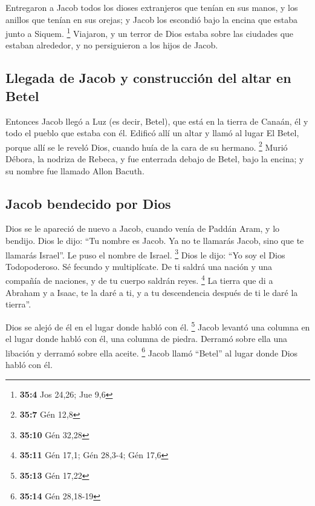  Entregaron a Jacob todos los dioses extranjeros que
tenían en sus manos, y los anillos que tenían en sus orejas; y Jacob los
escondió bajo la encina que estaba junto a Siquem. \footnote{\textbf{35:4}
  Jos 24,26; Jue 9,6}  Viajaron, y un terror de Dios
estaba sobre las ciudades que estaban alrededor, y no persiguieron a los
hijos de Jacob.

\hypertarget{llegada-de-jacob-y-construcciuxf3n-del-altar-en-betel}{%
\subsection{Llegada de Jacob y construcción del altar en
Betel}\label{llegada-de-jacob-y-construcciuxf3n-del-altar-en-betel}}

 Entonces Jacob llegó a Luz (es decir, Betel), que está en
la tierra de Canaán, él y todo el pueblo que estaba con él.
 Edificó allí un altar y llamó al lugar El Betel, porque
allí se le reveló Dios, cuando huía de la cara de su hermano.
\footnote{\textbf{35:7} Gén 12,8}  Murió Débora, la
nodriza de Rebeca, y fue enterrada debajo de Betel, bajo la encina; y su
nombre fue llamado Allon Bacuth.

\hypertarget{jacob-bendecido-por-dios}{%
\subsection{Jacob bendecido por Dios}\label{jacob-bendecido-por-dios}}

 Dios se le apareció de nuevo a Jacob, cuando venía de
Paddán Aram, y lo bendijo.  Dios le dijo: ``Tu nombre es
Jacob. Ya no te llamarás Jacob, sino que te llamarás Israel''. Le puso
el nombre de Israel. \footnote{\textbf{35:10} Gén 32,28} 
Dios le dijo: ``Yo soy el Dios Todopoderoso. Sé fecundo y multiplícate.
De ti saldrá una nación y una compañía de naciones, y de tu cuerpo
saldrán reyes. \footnote{\textbf{35:11} Gén 17,1; Gén 28,3-4; Gén 17,6}
 La tierra que di a Abraham y a Isaac, te la daré a ti, y
a tu descendencia después de ti le daré la tierra''.

 Dios se alejó de él en el lugar donde habló con él.
\footnote{\textbf{35:13} Gén 17,22}  Jacob levantó una
columna en el lugar donde habló con él, una columna de piedra. Derramó
sobre ella una libación y derramó sobre ella aceite. \footnote{\textbf{35:14}
  Gén 28,18-19}  Jacob llamó ``Betel'' al lugar donde
Dios habló con él.

